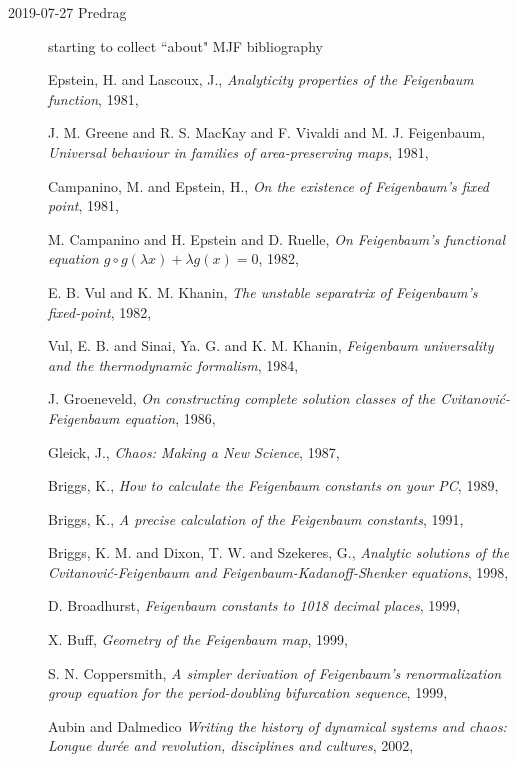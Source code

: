 \begin{description}
\item[2019-07-27 Predrag]
starting to collect ``about" MJF bibliography

{Epstein, H. and Lascoux, J.},
{\em Analyticity properties of the {Feigenbaum} function},
{1981},

{J. M. Greene and R. S. MacKay and F. Vivaldi and M. J. Feigenbaum},
{\em Universal behaviour in families of area-preserving maps},
{1981},

{Campanino, M. and Epstein, H.},
{\em On the existence of {Feigenbaum's} fixed point},
{1981},

{M. Campanino and H. Epstein and D. Ruelle},
{\em On {Feigenbaum}'s functional equation {$g \circ g(\lambda x) + \lambda g(x) = 0$}},
{1982},

{E. B. Vul and K. M. Khanin},
{\em The unstable separatrix of {Feigenbaum}'s fixed-point},
{1982},

{Vul, E. B. and Sinai, Ya. G. and K. M. Khanin},
{\em Feigenbaum universality and the thermodynamic formalism},
{1984},

{J. Groeneveld},
{\em On constructing complete solution classes of the {Cvitanovi{\'c}-Feigenbaum} equation},
{1986},

{Gleick, J.},
{\em {Chaos: Making a New Science}},
{1987},

{Briggs, K.},
{\em How to calculate the {Feigenbaum} constants on your {PC}},
{1989},

{Briggs, K.},
{\em A precise calculation of the {Feigenbaum} constants},
{1991},

{Briggs, K. M. and Dixon, T. W. and Szekeres, G.},
{\em Analytic solutions of the {Cvitanovi{\'c}-Feigenbaum} and {Feigenbaum-Kadanoff-Shenker} equations},
{1998},

{D. Broadhurst},
{\em Feigenbaum constants to 1018 decimal places},
{1999},

{X. Buff},
{\em Geometry of the {Feigenbaum} map},
{1999},

{S. N. Coppersmith},
{\em A simpler derivation of {Feigenbaum}'s renormalization group equation for the period-doubling bifurcation sequence},
{1999},

Aubin and Dalmedico
{\em Writing the history of dynamical systems and chaos: {Longue}
dur{\'{e}}e and revolution, disciplines and cultures},
{2002},


\end{description}
